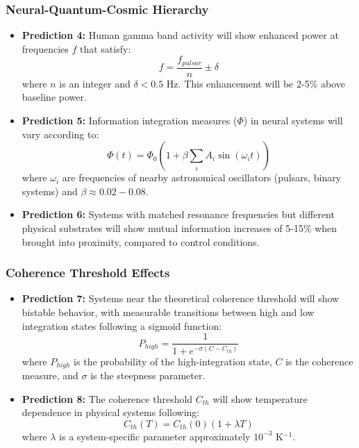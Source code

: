 \documentclass[12pt]{article}
\begin{document}
\subsubsection{Neural-Quantum-Cosmic Hierarchy}

\begin{itemize}
    \item \textbf{Prediction 4:} Human gamma band activity will show enhanced power at frequencies $f$ that satisfy:
    \begin{equation}
    f = \frac{f_{pulsar}}{n} \pm \delta
    \end{equation}
    where $n$ is an integer and $\delta < 0.5$ Hz. This enhancement will be 2-5\% above baseline power.
    
    \item \textbf{Prediction 5:} Information integration measures ($\Phi$) in neural systems will vary according to:
    \begin{equation}
    \Phi(t) = \Phi_0(1 + \beta\sum_i A_i\sin(\omega_i t))
    \end{equation}
    where $\omega_i$ are frequencies of nearby astronomical oscillators (pulsars, binary systems) and $\beta \approx 0.02-0.08$.
    
    \item \textbf{Prediction 6:} Systems with matched resonance frequencies but different physical substrates will show mutual information increases of 5-15\% when brought into proximity, compared to control conditions.
\end{itemize}

\subsubsection{Coherence Threshold Effects}

\begin{itemize}
    \item \textbf{Prediction 7:} Systems near the theoretical coherence threshold will show bistable behavior, with measurable transitions between high and low integration states following a sigmoid function:
    \begin{equation}
    P_{high} = \frac{1}{1 + e^{-\sigma(C - C_{th})}}
    \end{equation}
    where $P_{high}$ is the probability of the high-integration state, $C$ is the coherence measure, and $\sigma$ is the steepness parameter.
    
    \item \textbf{Prediction 8:} The coherence threshold $C_{th}$ will show temperature dependence in physical systems following:
    \begin{equation}
    C_{th}(T) = C_{th}(0)(1 + \lambda T)
    \end{equation}
    where $\lambda$ is a system-specific parameter approximately $10^{-3}$ K$^{-1}$.
\end{itemize}
\end{document}
